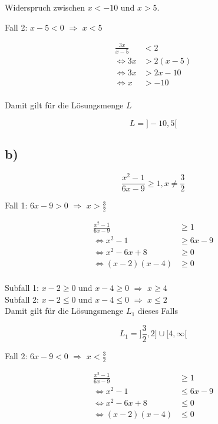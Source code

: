 \documentclass[a4paper, 11pt]{article}
\begin{document}
Widerspruch zwischen \(x < -10\) und \(x > 5\).

Fall 2: \(x - 5 < 0\) \(\Rightarrow\) \(x < 5\)

\begin{align*}
    \frac{3x}{x-5} &< 2 \\
    \Leftrightarrow 3x &> 2(x-5) \\
    \Leftrightarrow 3x &> 2x-10 \\
    \Leftrightarrow x &> -10 \\
\end{align*}

Damit gilt für die Lösungsmenge \(L\)

$$ L = ]-10, 5[ $$

\pagebreak

\subsection{b)}
\label{sec:org7e7d04a}
$$ \frac{x^2 - 1}{6x - 9} \geq 1, x \neq \frac{3}{2} $$

Fall 1: \(6x - 9 > 0\) \(\Rightarrow\) \(x > \frac{3}{2}\)

\begin{align*}
     \frac{x^2 - 1}{6x - 9} &\geq 1 \\
    \Leftrightarrow x^2 - 1 &\geq 6x - 9 \\
    \Leftrightarrow x^2 - 6x + 8 &\geq 0 \\
    \Leftrightarrow (x - 2)(x - 4) &\geq 0 \\
\end{align*}

Subfall 1: \(x - 2 \geq 0\) und \(x - 4 \geq 0\) \(\Rightarrow\) \(x \geq 4\) \\
Subfall 2: \(x - 2 \leq 0\) und \(x - 4 \leq 0\) \(\Rightarrow\) \(x \leq 2\) \\

Damit gilt für die Lösungsmenge \(L_1\) dieses Falls

$$ L_1 = ]\frac{3}{2}, 2] \cup [4, \infty[ $$

Fall 2: \(6x - 9 < 0\) \(\Rightarrow\) \(x < \frac{3}{2}\)

\begin{align*}
    \frac{x^2 - 1}{6x - 9} &\geq 1 \\
    \Leftrightarrow x^2 - 1 &\leq 6x - 9 \\
    \Leftrightarrow x^2 - 6x + 8 &\leq 0 \\
    \Leftrightarrow (x - 2)(x - 4) &\leq 0 \\
\end{align*}
\end{document}
